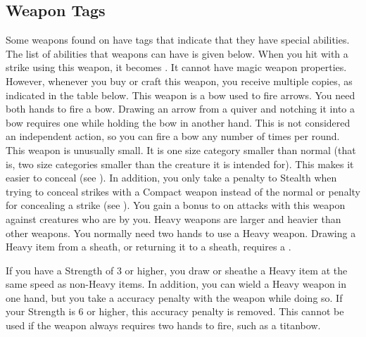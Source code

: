   \subsection{Weapon Tags}\label{Weapon Tags}
    Some weapons found on  have tags that indicate that they have special abilities. The list of abilities that weapons can have is given below.
     When you hit with a strike using this weapon, it becomes .
    It cannot have magic weapon properties.
    However, whenever you buy or craft this weapon, you receive multiple copies, as indicated in the table below.
     This weapon is a bow used to fire arrows.
    You need both hands to fire a bow.
    Drawing an arrow from a quiver and notching it into a bow requires one  while holding the bow in another hand.
    This is not considered an independent action, so you can fire a bow any number of times per round.
     This weapon is unusually small.
    It is one size category smaller than normal (that is, two size categories smaller than the creature it is intended for).
    This makes it easier to conceal (see ).
    In addition, you only take a  penalty to Stealth when trying to conceal strikes with a Compact weapon instead of the normal  or  penalty for concealing a strike (see ).
     You gain a  bonus to  on  attacks with this weapon against creatures who are \grappled by you.
     Heavy weapons are larger and heavier than other weapons.
    You normally need two hands to use a Heavy weapon.
    Drawing a Heavy item from a sheath, or returning it to a sheath, requires a .

    If you have a Strength of 3 or higher, you draw or sheathe a Heavy item at the same speed as non-Heavy items.
    In addition, you can wield a Heavy weapon in one hand, but you take a  accuracy penalty with the weapon while doing so.
    If your Strength is 6 or higher, this accuracy penalty is removed.
    This cannot be used if the weapon always requires two hands to fire, such as a titanbow.

